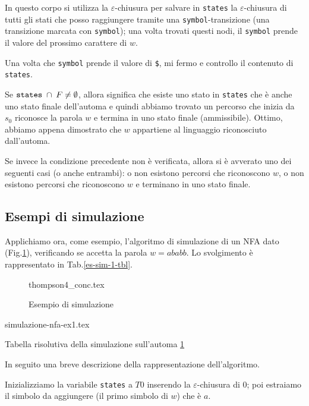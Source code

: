 \documentclass[class=book, crop=false, oneside, 12pt]{standalone}
\begin{document}
In questo corpo si utilizza la \(\varepsilon\)-chiusura per salvare in \texttt{states} la \(\varepsilon\)-chiusura di tutti gli stati che posso raggiungere tramite una \texttt{symbol}-transizione (una transizione marcata con \texttt{symbol}); una volta trovati questi nodi, il \texttt{symbol} prende il valore del prossimo carattere di \(w\).

Una volta che \texttt{symbol} prende il valore di \texttt{\$}, mi fermo e controllo il contenuto di \texttt{states}.

Se \(\textrm{\texttt{states}} \; \cap \; F \neq \emptyset\), allora significa che esiste uno stato in \texttt{states} che è anche uno stato finale dell'automa e quindi abbiamo trovato un percorso che inizia da \(s_0\) riconosce la parola \(w\) e termina in uno stato finale (ammissibile). Ottimo, abbiamo appena dimostrato che \(w\) appartiene al linguaggio riconosciuto dall'automa.

Se invece la condizione precedente non è verificata, allora si è avverato uno dei seguenti casi (o anche entrambi): o non esistono percorsi che riconoscono \(w\), o non esistono percorsi che riconoscono \(w\) e terminano in uno stato finale.

\subsection{Esempi di simulazione}
Applichiamo ora, come esempio, l'algoritmo di simulazione di un NFA dato (Fig.\ref{es-sim-1}), verificando se accetta la parola \(w  = ababb\). Lo svolgimento è rappresentato in Tab.\ref{es-sim-1-tbl}.

\begin{figure}
    \centering
    {thompson4_conc.tex}
    \caption{Esempio di simulazione}
    \label{es-sim-1}
\end{figure}

\begin{table}[H]
	\centering
	{simulazione-nfa-ex1.tex}
    \caption{Tabella risolutiva della simulazione sull'automa \ref{es-sim-1}}
    \label{es-sim-1-tbl}
\end{table} 

\noindent In seguito una breve descrizione della rappresentazione dell'algoritmo.

Inizializziamo la variabile \texttt{states} a \(T0\) inserendo la \(\varepsilon\)-chiusura di \(0\); poi estraiamo il simbolo da aggiungere (il primo simbolo di \(w\)) che è \(a\).
\end{document}
